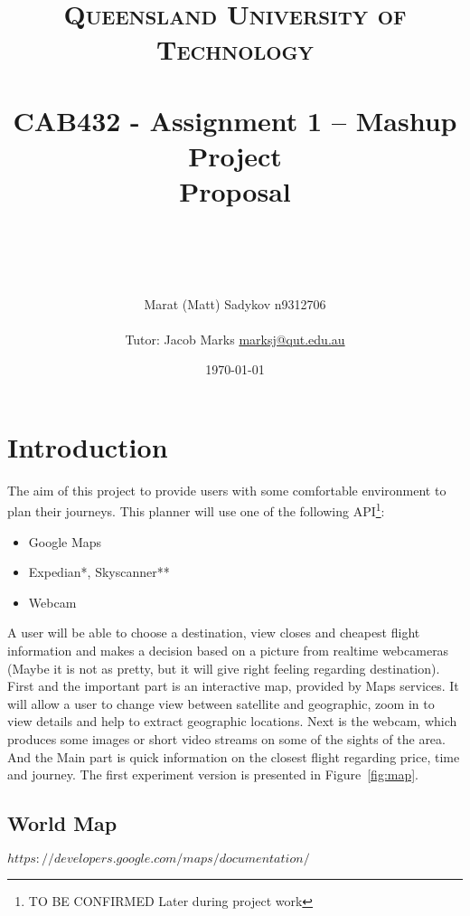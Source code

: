 \documentclass[12pt]{article}
\title{	
	\normalfont \normalsize 
	\textsc{Queensland University of Technology} \\ [25pt] 
	\horrule{0.5pt} \\[0.4cm] %
	\huge CAB432 - Assignment 1 – Mashup Project \\ Proposal \\ %
	\author{ Marat (Matt) Sadykov \small n9312706 \\ \\ Tutor: Jacob Marks \small \underline{marksj@qut.edu.au}}
	\date{\normalsize\today} %
	\horrule{2pt} \\[0.5cm] %
}
\numberwithin{equation}{section} %
\numberwithin{figure}{section} %
\numberwithin{table}{section} %
\begin{document}
\maketitle
\newpage
\newpage
\section{Introduction}	

	The aim of this project to provide users with some comfortable environment to plan their journeys. This planner will use one of the following API\footnote{TO BE CONFIRMED Later during project work}: 
	
	\begin{itemize}
		\item Google Maps
		\item Expedian*, Skyscanner**
		\item Webcam
	\end{itemize}
	
	A user will be able to choose a destination, view closes and cheapest flight information and makes a decision based on a picture from realtime webcameras (Maybe it is not as pretty, but it will give right feeling regarding destination). First and the important part is an interactive map, provided by Maps services. It will allow a user to change view between satellite and geographic, zoom in to view details and help to extract geographic locations. Next is the webcam, which produces some images or short video streams on some of the sights of the area. And the Main part is quick information on the closest flight regarding price, time and journey. The first experiment version is presented in Figure~\ref{fig:map}.
	

	

	\subsection{World Map}
		$ https://developers.google.com/maps/documentation/ $ \\
		
\end{document}

